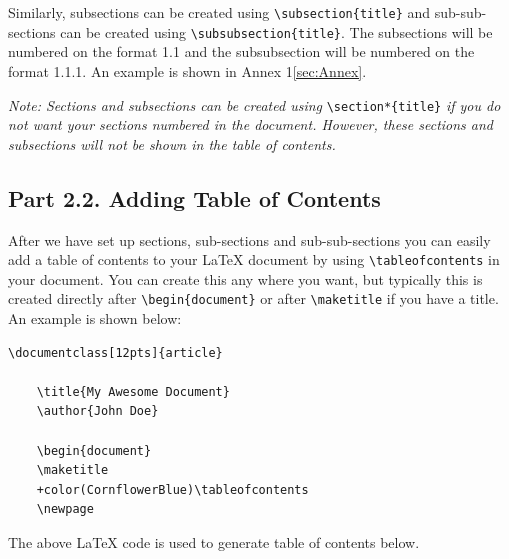 \documentclass[12pts]{report}
\begin{document}
Similarly, subsections can be created using \verb|\subsection{title}| and sub-sub-sections can be created using \verb|\subsubsection{title}|. The subsections will be numbered on the format 1.1 and the subsubsection will be numbered on the format 1.1.1. An example is shown in Annex 1\ref{sec:Annex}. 

\textit{Note: Sections and subsections can be created using} \verb|\section*{title}| \textit{if you do not want your sections numbered in the document. However, these sections and subsections will not be shown in the table of contents.}


\clearpage
\subsection*{Part 2.2. Adding Table of Contents}

After we have set up sections, sub-sections and sub-sub-sections you can easily add a table of contents to your {\LaTeX} document by using \verb|\tableofcontents| in your document. You can create this any where you want, but typically this is created directly after \verb|\begin{document}| or after \verb|\maketitle| if you have a title.  An example is shown below:

\begin{Verbatim}[commandchars=+\(\)]
	\documentclass[12pts]{article}
	
	\title{My Awesome Document}
	\author{John Doe}
	
	\begin{document}
	\maketitle
	+color(CornflowerBlue)\tableofcontents
	\newpage

\end{Verbatim}
The above {\LaTeX} code is used to generate table of contents below.
\end{document}
